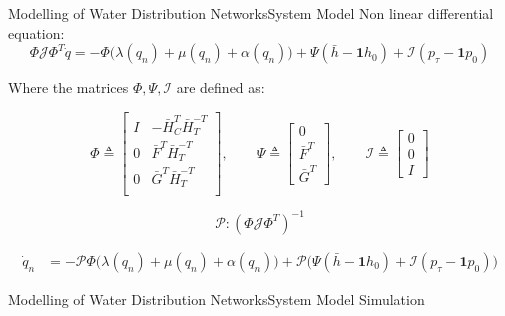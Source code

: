 \begin{frame}{Modelling of Water Distribution Networks}{System Model}
	Non linear differential equation:
	\begin{equation}
		\Phi\mathcal{J}\Phi^T \dot{q} = -\Phi\Big(\lambda(q_n)+\mu(q_n)+\alpha(q_n)\Big) + \Psi(\bar{h}-\mathbf{1}h_0) + \mathcal{I}(p_{\tau}-\mathbf{1}p_0)
	\end{equation}

	Where the matrices $\Phi, \Psi, \mathcal{I}$ are defined as:
	
	\begin{equation}
		\Phi \triangleq 
		\begin{bmatrix} 
			I & -\bar{H}_C^T\bar{H}_T^{-T} \\ 0 & \bar{F}^T\bar{H}_T^{-T} \\ 0  & \bar{G}^T\bar{H}_T^{-T} \\ 
		\end{bmatrix}
		, \qquad
		\Psi \triangleq
		\begin{bmatrix}
			0 \\ \bar{F}^T \\ \bar{G}^T
		\end{bmatrix}
		, \qquad
		\mathcal{I} \triangleq
		\begin{bmatrix}
			0 \\ 0 \\ I
		\end{bmatrix}
	\end{equation}

	\begin{equation}
		\mathcal{P}: (\Phi \mathcal{J} \Phi^T)^{-1}
	\end{equation}
	
	
	
	\begin{equation}\label{eq:NonLinearModelSimplified}
		\begin{split}
			\dot{q}_n &=  -\mathcal{P}\Phi\Big(\lambda(q_n)+\mu(q_n)+\alpha(q_n)\Big) + \mathcal{P}\Big(\Psi(\bar{h}-\mathbf{1}h_0) + \mathcal{I}(p_{\tau}-\mathbf{1}p_0)\Big) 
		\end{split}	
	\end{equation}

\end{frame}

\begin{frame}{Modelling of Water Distribution Networks}{System Model Simulation}
	
	
\end{frame}
